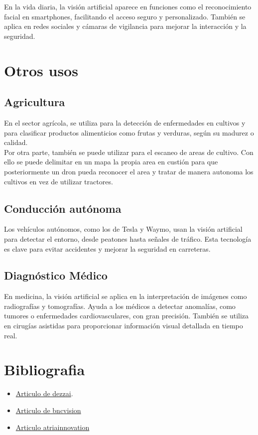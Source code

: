 \documentclass[12pt]{article}
\begin{document}
En la vida diaria, la visión artificial aparece en funciones como el reconocimiento facial en smartphones, facilitando el acceso seguro y personalizado. 
También se aplica en redes sociales y cámaras de vigilancia para mejorar la interacción y la seguridad.

\clearpage
\section{Otros usos}
\subsection{Agricultura}
En el sector agrícola, se utiliza para la detección de enfermedades en cultivos y para clasificar productos alimenticios como frutas y verduras, según su madurez o calidad.
\\
Por otra parte, también se puede utilizar para el escaneo de areas de cultivo. Con ello se puede delimitar en un mapa la propia area en custión para que posteriormente un dron pueda reconocer el area y
tratar de manera autonoma los cultivos en vez de utilizar tractores.

\subsection{Conducción autónoma}

Los vehículos autónomos, como los de Tesla y Waymo, usan la visión artificial para detectar el entorno, desde peatones hasta señales de tráfico. 
Esta tecnología es clave para evitar accidentes y mejorar la seguridad en carreteras.

\subsection{Diagnóstico Médico}

En medicina, la visión artificial se aplica en la interpretación de imágenes como radiografías y tomografías. Ayuda a los médicos a detectar anomalías, 
como tumores o enfermedades cardiovasculares, con gran precisión. También se utiliza en cirugías asistidas para proporcionar información visual detallada en tiempo real.
\clearpage

\section{Bibliografia}
\begin{itemize}
    \item \href{https://dezzai.com/es/blog/explorando-las-posibilidades-8-ejemplos-reales-de-vision-artificial/}{Articulo de dezzai}.
    \item \href{https://bcnvision.es/blog-vision-artificial/las-10-mejores-aplicaciones-de-vision-artificial-en-la-industria/}{Articulo de bncvision}
    \item \href{https://atriainnovation.com/blog/aplicaciones-de-la-vision-artificial-en-la-industria/}{Articulo atriainnovation}
\end{itemize}
\end{document}
